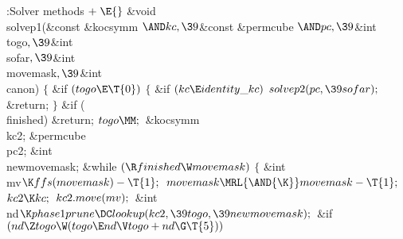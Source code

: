 \Y\B\4:Solver methods\X${}\mathrel+\E{}$\6
\&{void} \\{solvep1}(\&{const} \&{kocsymm} ${}{\AND}\\{kc},\39{}$\&{const} %
\&{permcube} ${}{\AND}\\{pc},\39{}$\&{int} \\{togo}${},\39{}$\&{int} %
\\{sofar}${},\39{}$\&{int} \\{movemask}${},\39{}$\&{int} \\{canon})\1\1\2\2\6
${}\{{}$\1\6
\&{if} ${}(\\{togo}\E\T{0}){}$\5
${}\{{}$\1\6
\&{if} ${}(\\{kc}\E\\{identity\_kc}){}$\1\5
${}\\{solvep2}(\\{pc},\39\\{sofar});{}$\2\6
\&{return};\6
\4${}\}{}$\2\6
\&{if} (\\{finished})\1\5
\&{return};\2\6
${}\\{togo}\MM;{}$\7
\&{kocsymm} \\{kc2};\6
\&{permcube} \\{pc2};\6
\&{int} \\{newmovemask};\7
\&{while} ${}(\R\\{finished}\W\\{movemask}){}$\5
${}\{{}$\1\6
\&{int} \\{mv}${}\K\\{ffs}(\\{movemask})-\T{1};{}$\7
${}\\{movemask}\MRL{\AND{\K}}\\{movemask}-\T{1};{}$\6
${}\\{kc2}\K\\{kc};{}$\6
${}\\{kc2}.\\{move}(\\{mv});{}$\7
\&{int} \\{nd}${}\K\\{phase1prune}\DC\\{lookup}(\\{kc2},\39\\{togo},\39%
\\{newmovemask});{}$\7
\&{if} ${}(\\{nd}\Z\\{togo}\W(\\{togo}\E\\{nd}\V\\{togo}+\\{nd}\G\T{5})){}$\5
